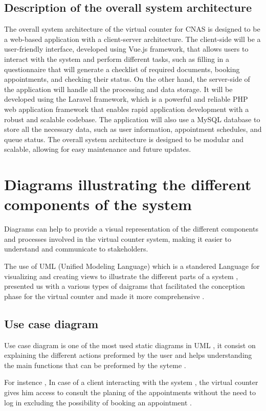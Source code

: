 \subsection{Description of the overall system architecture}
The overall system architecture of the virtual counter for CNAS is designed to be a web-based application with a client-server architecture. The client-side will be a user-friendly interface, developed using Vue.js framework, that allows users to interact with the system and perform different tasks, such as filling in a questionnaire that will generate a checklist of required documents, booking appointments, and checking their status. On the other hand, the server-side of the application will handle all the processing and data storage. It will be developed using the Laravel framework, which is a powerful and reliable PHP web application framework that enables rapid application development with a robust and scalable codebase. The application will also use a MySQL database to store all the necessary data, such as user information, appointment schedules, and queue status. The overall system architecture is designed to be modular and scalable, allowing for easy maintenance and future updates.
\section{Diagrams illustrating the different components of the system}
Diagrams can help to provide a visual representation of the different components and processes involved in the virtual counter system, making it easier to understand and communicate to stakeholders.

\medskip The use of UML (Unified Modeling Language) which is a standered Language for visualizing and creating views to illustrate the different parts of a system , presented us with a various types of daigrams that facilitated the conception phase for the virtual counter and made it more comprehensive .  

\subsection{Use case diagram}
Use case diagram is one of the most used static diagrams in UML , it consist on explaining the different actions preformed by the user and helps understanding the main functions that can be preformed by the syteme .  

For instence , In case of a client interacting with the system , the virtual counter gives him access to consult the planing of the appointments without the need to log in excluding the possibility of booking an appointment . 
 
